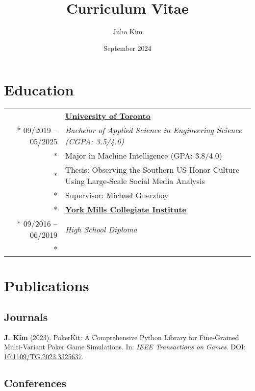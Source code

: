 \documentclass{article}
\title{Curriculum Vitae}
\author{Juho Kim}
\date{September 2024}
\begin{document}
	\maketitle

	\section*{Education}

	\begin{tabularx}{\textwidth}{r X}
		& \textbf{\href{https://www.utoronto.ca/}{University of Toronto}} \\*
		09/2019 -- 05/2025 & \textit{Bachelor of Applied Science in Engineering Science {\small (CGPA: 3.5/4.0)}} \\*
		& {\small Major in Machine Intelligence (GPA: 3.8/4.0)} \\*
		& {\small Thesis: Observing the Southern US Honor Culture Using Large-Scale Social Media Analysis} \\*
		& {\small Supervisor: Michael Guerzhoy} \\*
		\iftoggle{verbose}{
			\addlinespace
			& \textbf{\href{https://schoolweb.tdsb.on.ca/yorkmillsci/}{York Mills Collegiate Institute}} \\*
			09/2016 -- 06/2019 & \textit{High School Diploma} \\*
		}{}
	\end{tabularx}

	\section*{Publications}

	\subsection*{Journals}

	\begin{etaremune}
		\item \textbf{J. Kim} (2023). PokerKit: A Comprehensive Python Library for Fine-Grained Multi-Variant Poker Game Simulations. In: \textit{IEEE Transactions on Games}. {\small DOI: \href{https://doi.org/10.1109/TG.2023.3325637}{10.1109/TG.2023.3325637}.}
	\end{etaremune}

	\subsection*{Conferences}
\end{document}
